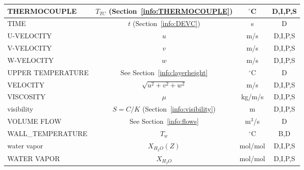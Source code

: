 \documentclass[11pt]{book}
\begin{document}
\begin{table}[h!]
\begin{center}
\begin{tabular}{|l|c|c|c|}
{\ct THERMOCOUPLE}                              & $T_{TC}$ (Section~\ref{info:THERMOCOUPLE})    & $^\circ$C      & D,I,P,S      \\ \hline
{\ct TIME}                                      & $t$ (Section~\ref{info:DEVC})                 & s              & D            \\ \hline
{\ct U-VELOCITY}                                & $u$                                           & m/s            & D,I,P,S      \\ \hline
{\ct V-VELOCITY}                                & $v$                                           & m/s            & D,I,P,S      \\ \hline
{\ct W-VELOCITY}                                & $w$                                           & m/s            & D,I,P,S      \\ \hline
{\ct UPPER TEMPERATURE}                         & See Section~\ref{info:layerheight}            & $^\circ$C      & D            \\ \hline
{\ct VELOCITY}                                  & $\sqrt{u^2+v^2+w^2}$                          & m/s            & D,I,P,S      \\ \hline
{\ct VISCOSITY}                                 & $\mu$                                         & kg/m/s         & D,I,P,S      \\ \hline
{\ct visibility}                                & $S=C/K$ (Section~\ref{info:visibility})       & m              & D,I,P,S      \\ \hline
{\ct VOLUME FLOW}                               & See Section~\ref{info:flows}                  & m$^3$/s        & D            \\ \hline
{\ct WALL\_TEMPERATURE}                         & $T_w$                                         & $^\circ$C      & B,D          \\ \hline
{\ct water vapor}                               & $X_{H_2O}(Z)$                                 & mol/mol        & D,I,P,S      \\ \hline
{\ct WATER VAPOR}                               & $X_{H_2O}$                                    & mol/mol        & D,I,P,S      \\ \hline
\end{tabular}
\end{center}
\end{table}
\end{document}
